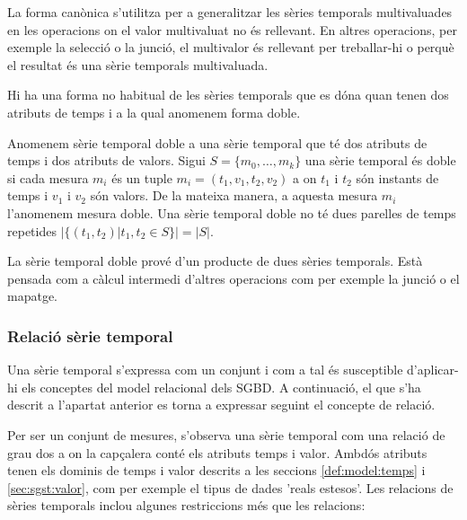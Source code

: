 La forma canònica s'utilitza per a generalitzar les sèries temporals
multivaluades en les operacions on el valor multivaluat no és
rellevant. En altres operacions, per exemple la selecció o la junció,
el multivalor és rellevant per treballar-hi o perquè el resultat és
una sèrie temporals multivaluada. 



Hi ha una forma no habitual de les sèries temporals que es dóna quan
tenen dos atributs de temps i a la qual anomenem forma doble.

\begin{definition}
  \label{def:sgst:st-doble}
  Anomenem sèrie temporal doble a una sèrie temporal que té dos
  atributs de temps i dos atributs de valors. Sigui $S =\{m_0, \dotsc,
  m_k\}$ una sèrie temporal és doble si cada mesura $m_i$ és un tuple
  $m_i=(t_1,v_1,t_2,v_2)$ a on $t_1$ i $t_2$ són instants de temps i
  $v_1$ i $v_2$ són valors. De la mateixa manera, a aquesta mesura
  $m_i$ l'anomenem mesura doble.  Una sèrie temporal doble no té dues
  parelles de temps repetides $|\{(t_1,t_2) | t_1,t_2\in S\}| = |S|$.
\end{definition}

La sèrie temporal doble prové d'un producte de dues sèries
temporals. Està pensada com a càlcul intermedi d'altres operacions com
per exemple la junció o el mapatge. 









\subsubsection{Relació sèrie temporal}

Una sèrie temporal s'expressa com un conjunt i com a tal és
susceptible d'aplicar-hi els conceptes del model relacional dels
SGBD. A continuació, el que s'ha descrit a l'apartat anterior es torna
a expressar seguint el concepte de relació.


Per ser un conjunt de mesures, s'observa una sèrie temporal com una
relació de grau dos a on la capçalera conté els atributs temps i
valor. Ambdós atributs tenen els dominis de temps i valor descrits a
les seccions \ref{def:model:temps} i \ref{sec:sgst:valor}, com per
exemple el tipus de dades 'reals estesos'. Les relacions de sèries
temporals inclou algunes restriccions més que les relacions:


